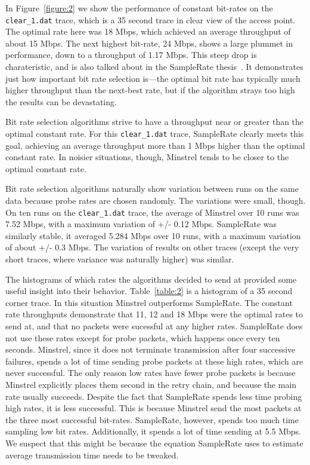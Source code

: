 \documentclass[twocolumn,10pt]{article}
\begin{document}
In Figure~\ref{figure:2} we show the performance of constant bit-rates
on the \texttt{clear\_1.dat} trace, which is a 35 second trace in
clear view of the access point.  The optimal rate here was 18 Mbps,
which achieved an average throughput of about 15 Mbps.  The next
highest bit-rate, 24 Mbps, shows a large plummet in performance, down
to a throughput of 1.17 Mbps.  This steep drop is charateristic, and is
also talked about in the SampleRate thesis~\cite{samplerate}.  It
demonstrates just how important bit rate selection is---the optimal
bit rate has typically much higher throughput than the next-best rate,
but if the algorithm strays too high the results can be devastating.

Bit rate selection algorithms strive to have a throughput near or
greater than the optimal constant rate.  For this
\texttt{clear\_1.dat} trace, SampleRate clearly meets this goal,
achieving an average throughput more than 1 Mbps higher than the
optimal constant rate.  In noisier situations, though, Minstrel tends
to be closer to the optimal constant rate.

Bit rate selection algorithms naturally show variation between runs on
the same data because probe rates are chosen randomly.  The variations
were small, though.  On ten runs on the \texttt{clear\_1.dat} trace,
the average of Minstrel over 10 runs was 7.52 Mbps, with a maximum
variation of +/- 0.12 Mbps.  SampleRate was similarly stable, it
averaged 5.284 Mbps over 10 runs, with a maximum variation of about
+/- 0.3 Mbps.  The variation of results on other traces (except the
very short traces, where variance was naturally higher) was similar.

The histograms of which rates the algorithms decided to send at
provided some useful insight into their behavior.  Table~\ref{table:2}
is a histogram of a 35 second corner trace.  In this situation
Minstrel outperforms SampleRate.  The constant rate throughputs
demonstrate that 11, 12 and 18 Mbps were the optimal rates to send at,
and that no packets were sucessful at any higher rates.  SampleRate
does not use these rates except for probe packets, which happens once
every ten seconds.  Minstrel, since it does not terminate transmission
after four successive failures, spends a lot of time sending probe
packets at these high rates, which are never successful.  The only
reason low rates have fewer probe packets is because Minstrel
explicitly places them second in the retry chain, and because the main
rate usually succeeds.  Despite the fact that SampleRate spends less
time probing high rates, it is less successful.  This is because
Minstrel send the most packets at the three most successful bit-rates.
SampleRate, however, spends too much time sampling low bit rates.
Additionally, it spends a lot of time sending at 5.5 Mbps.  We suspect
that this might be because the equation SampleRate uses to estimate
average transmission time needs to be tweaked.
\end{document}
